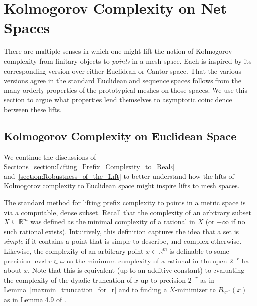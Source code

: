
\section{Kolmogorov Complexity on Net Spaces}
\label{section:Kolmogorov_Complexity_on_Net_Spaces}

There are multiple senses in which one might lift the notion of Kolmogorov complexity from finitary objects to \textit{points} in a mesh space. Each is inspired by its corresponding version over either Euclidean or Cantor space. That the various versions agree in the standard Euclidean and sequence spaces follows from the many orderly properties of the prototypical meshes on those spaces. We use this section to argue what properties lend themselves to asymptotic coincidence between these lifts.

\subsection{Kolmogorov Complexity on Euclidean Space}

We continue the discussions of Sections~\ref{section:Lifting_Prefix_Complexity_to_Reals} and~\ref{section:Robustness_of_the_Lift} to better understand how the lifts of Kolmogorov complexity to Euclidean space might inspire lifts to mesh spaces.

The standard method for lifting prefix complexity to points in a metric space is via a computable, dense subset. Recall that the complexity of an arbitrary subset $X \subseteq \mathbb{R}^m$ was defined as the minimal complexity of a rational in $X$ (or $+\infty$ if no such rational exists). 
Intuitively, this definition captures the idea that a set is \textit{simple} if it contains a point that is simple to describe, and complex otherwise. 
Likewise, the complexity of an arbitrary point $x \in \mathbb{R}^m$ is definable to some precision-level $r \in \omega$ as the minimum complexity of a rational in the open $2^{-r}$-ball about $x$. Note that this is equivalent (up to an additive constant) to evaluating the complexity of the dyadic truncation of $x$ up to precision $2^{-r}$ as in Lemma~\ref{maxmin_truncation_for_r} and to finding a $K$-minimizer to $B_{2^{-r}}(x)$ as in Lemma 4.9 of \cite{CL14}. 

